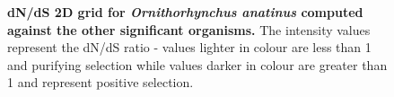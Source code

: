 \documentclass{article}
\begin{document}
\begin{figure}[H]
\centering
{}
\caption{\textbf{dN/dS 2D grid for \textit{Ornithorhynchus anatinus} computed against the other significant organisms.} The intensity values represent the dN/dS ratio - values lighter in colour are less than 1 and purifying selection while values darker in colour are greater than 1 and represent positive selection.}
\label{sup_fig_30}
\end{figure}
\end{document}
